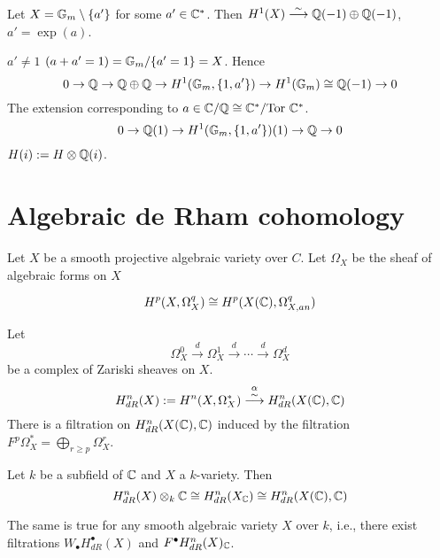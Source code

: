 \begin{exam}
Let $X = \mathbb{G}_m \setminus \{a'\}$ for some $a' \in \mathbb{C}^*$. Then $H^1(X) \stackrel{\sim}{\longrightarrow} \mathbb{Q}(-1) \oplus \mathbb{Q}(-1)$, $a' = \exp(a)$.
\end{exam}
\begin{exam}
$a' \neq 1$ $(a + a' = 1) = \mathbb{G}_m / \{ a'=1 \} = X$. Hence
\[
0 \to \mathbb{Q} \to \mathbb{Q} \oplus \mathbb{Q} \to H^1(\mathbb{G}_m, \{1, a'\}) \to H^1(\mathbb{G}_m) \cong \mathbb{Q}(-1) \to 0
\]
The extension corresponding to $a \in \mathbb{C} / \mathbb{Q} \cong \mathbb{C}^* / \mathrm{Tor~}\mathbb{C}^*$.
\[
0 \to \mathbb{Q}(1) \to H^1(\mathbb{G}_m, \{1, a'\})(1) \to \mathbb{Q} \to 0
\]
$H(i) := H \otimes \mathbb{Q}(i)$.
\end{exam}

\section{Algebraic de Rham cohomology}
Let $X$ be a smooth projective algebraic variety over $C$. Let $\Omega_X$ be the sheaf of algebraic forms on $X$
\begin{prop}[GAGA]
\[
H^p(X, \Omega_X^q) \cong H^p(X(\mathbb{C}), \Omega^q_{X, an})
\]
\end{prop}
Let
\[
\Omega_X^0 \stackrel{d}{\to} \Omega_X^1 \stackrel{d}{\to} \cdots \stackrel{d}{\to} \Omega_X^d
\]
be a complex of Zariski sheaves on $X$.
\[
H^n_{dR}(X) := H^n(X, \Omega_X^*) \stackrel{\alpha}{\stackrel{\sim}{\longrightarrow}} H^n_{dR}(X(\mathbb{C}),\mathbb{C})
\]
There is a filtration on $H^n_{dR}(X(\mathbb{C}),\mathbb{C})$ induced by the filtration $F^p \Omega_X^* = \bigoplus_{r \geq p} \Omega_X^r$.

Let $k$ be a subfield of $\mathbb{C}$ and $X$ a $k$-variety. Then
\[
H^n_{dR}(X) \otimes_k \mathbb{C} \cong H^n_{dR}(X_{\mathbb{C}}) \cong H^n_{dR}(X(\mathbb{C}),\mathbb{C})
\]

\begin{rem}
The same is true for any smooth algebraic variety $X$ over $k$, i.e., there exist filtrations $W_{\bullet}H^{\bullet}_{dR}(X)$ and $F^{\bullet}H^n_{dR}(X)_{\mathbb{C}}$.
\end{rem}

